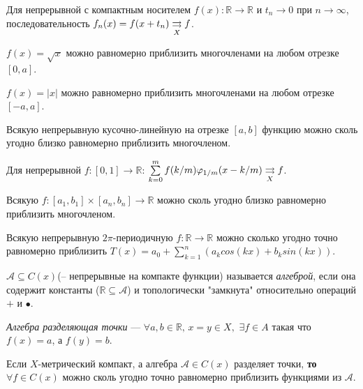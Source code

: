 
\begin{to_lem}
	Для непрерывной с компактным носителем $f(x) \colon \mathbb{R} \to \mathbb{R}$ и $t_n \to 0$ при $n \to \infty$, последовательность $f_n(x) = f(x + t_n) \underset{X}{\rightrightarrows} f$.
\end{to_lem}

\begin{to_lem}
	$f(x) = \sqrt{x}$ можно равномерно приблизить многочленами на любом отрезке $[0,a]$.
\end{to_lem}

\begin{to_lem}
	$f(x) = |x|$ можно равномерно приблизить многочленами на любом отрезке $[-a,a]$.
\end{to_lem}

\begin{to_thr}
	Всякую непрерывную кусочно-линейную на отрезке $[a, b]$ функцию можно сколь угодно близко равномерно приблизить многочленом.
\end{to_thr}

\begin{to_lem}
	Для непрерывной $f \colon [0,1] \to \mathbb{R}$: $\sum\limits_{k = 0}^{m} f(k/m) \varphi_{1/m} (x - k/m) \underset{X}{\rightrightarrows} f$.
\end{to_lem}

\begin{to_thr}
	Всякую $f \colon [a_1, b_1] \times [a_n, b_n] \to \mathbb{R}$ можно сколь угодно близко
равномерно приблизить многочленом.
\end{to_thr}


\begin{to_thr}
	Всякую непрерывную $2\pi$-периодичную $f \colon \mathbb{R} \to \mathbb{R}$ можно сколько угодно точно равномерно приблизить $T(x) = a_0 + \sum\limits_{k = 1}^{n}(a_k cos(k x) + b_k sin(k x)) $.

\end{to_thr}

\begin{to_def}
	$\mathcal{A} \subseteq C(x)$(-- непрерывные на компакте функции) называется \textit{алгеброй}, если она содержит константы ($\mathbb{R} \subseteq \mathcal{A}$) и топологически "замкнута" относительно операций $+$ и $\bullet$.
\end{to_def}

\begin{to_def}
	\textit{Алгебра разделяющая точки} --- $\forall a, b \in \mathbb{R},\, x=y \in X,\, \, \exists f \in A$ такая что $f(x)=a$, а $f(y) = b$.
\end{to_def}

\begin{to_thr}
	Если $X$-метрический компакт, а алгебра $\mathcal{A}\in C(x)$ разделяет точки, \textbf{то} $\forall f \in C(x)$ можно сколь угодно точно равномерно приблизить функциями из $\mathcal{A}$.
\end{to_thr}